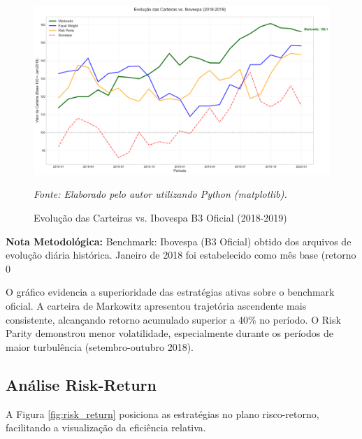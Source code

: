 \begin{figure}[H]
\centering
\includegraphics[width=\textwidth]{images/portfolio_evolution.png}
\caption{Evolução das Carteiras vs. Ibovespa B3 Oficial (2018-2019)}
\textit{Fonte: Elaborado pelo autor utilizando Python (matplotlib).}
\label{fig:portfolio_evolution}
\end{figure}

\textbf{Nota Metodológica:} Benchmark: Ibovespa (B3 Oficial) obtido dos arquivos de evolução diária histórica. Janeiro de 2018 foi estabelecido como mês base (retorno 0%

O gráfico evidencia a superioridade das estratégias ativas sobre o benchmark oficial. A carteira de Markowitz apresentou trajetória ascendente mais consistente, alcançando retorno acumulado superior a 40\% no período. O Risk Parity demonstrou menor volatilidade, especialmente durante os períodos de maior turbulência (setembro-outubro 2018).

\subsection{Análise Risk-Return}

A Figura \ref{fig:risk_return} posiciona as estratégias no plano risco-retorno, facilitando a visualização da eficiência relativa.

